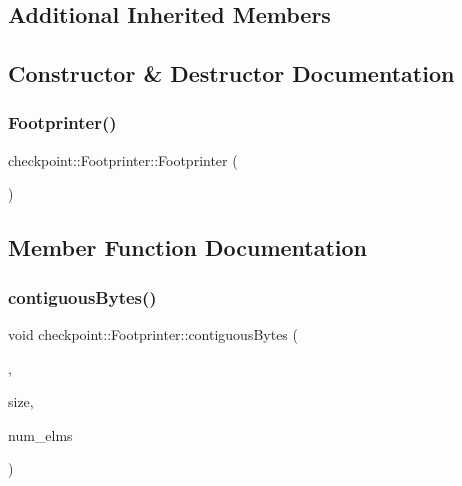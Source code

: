 \subsection*{Additional Inherited Members}


\subsection{Constructor \& Destructor Documentation}
\mbox{\label{structcheckpoint_1_1_footprinter_a79d7f7f0b753be09ac841dfd1af4a4d4}} 
\subsubsection{\texorpdfstring{Footprinter()}{Footprinter()}}
{\footnotesize\ttfamily checkpoint\+::\+Footprinter\+::\+Footprinter (\begin{DoxyParamCaption}{ }\end{DoxyParamCaption})\hspace{0.3cm}{\ttfamily [inline]}}



\subsection{Member Function Documentation}
\mbox{\label{structcheckpoint_1_1_footprinter_a88872ac85c679331c2bd4ab5d26e585a}} 
\subsubsection{\texorpdfstring{contiguous\+Bytes()}{contiguousBytes()}}
{\footnotesize\ttfamily void checkpoint\+::\+Footprinter\+::contiguous\+Bytes (\begin{DoxyParamCaption}\item[{void $\ast$}]{,  }\item[{\hyperlink{namespacecheckpoint_a083f6674da3f94c2901b18c6d238217c}{Serial\+Size\+Type}}]{size,  }\item[{\hyperlink{namespacecheckpoint_a083f6674da3f94c2901b18c6d238217c}{Serial\+Size\+Type}}]{num\+\_\+elms }\end{DoxyParamCaption})\hspace{0.3cm}{\ttfamily [inline]}}

